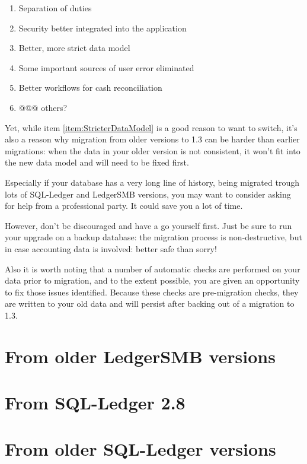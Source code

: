 \begin{enumerate}
\item Separation of duties
\item Security better integrated into the application
\item Better, more strict data model
\label{item:StricterDataModel}
\item Some important sources of user error eliminated
\item Better workflows for cash reconciliation
\item @@@ others?
\end{enumerate}

Yet, while item \ref{item:StricterDataModel} is a good reason to want to switch, it's
also a reason why migration from older versions to 1.3 can be harder than earlier
migrations: when the data
in your older version is not consistent, it won't fit into the new data model and
will need to be fixed first.

Especially if your database has a very long line of history, being migrated trough
lots of SQL-Ledger and LedgerSMB versions, you may want to consider asking for help
from a professional party. It could save you a lot of time.

However, don't be discouraged and have a go yourself first. Just be sure to run
your upgrade on a backup database: the migration process is non-destructive, but
in case accounting data is involved: better safe than sorry!

Also it is worth noting that a number of automatic checks are performed on your
data prior to migration, and to the extent possible, you are given an
opportunity to fix those issues identified.  Because these checks are
pre-migration checks, they are written to your old data and will persist after
backing out of a migration to 1.3.

\section{From older LedgerSMB versions}

\section{From SQL-Ledger 2.8}

\section{From older SQL-Ledger versions}

